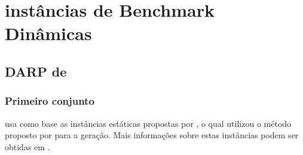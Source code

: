 \documentclass{anpet}
\begin{document}
\section{instâncias de Benchmark Dinâmicas}
\subsection{DARP de \textcite{berbeglia_hybrid_2012}}
\subsubsection{Primeiro conjunto \parencite{ropke_models_2007}}

\textcite{berbeglia_hybrid_2012} usa como base as instâncias estáticas propostas por \textcite{ropke_models_2007}, o qual utilizou o método proposto por \textcite{savelsbergh_drive:_1998} para a geração. Mais informações sobre estas instâncias podem ser obtidas em \textcite{cordeau_branch-and-cut_2006}.
\end{document}
